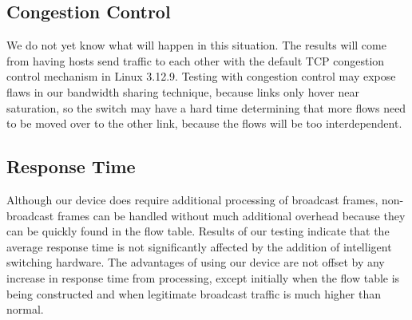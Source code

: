   \subsection{Congestion Control}
    We do not yet know what will happen in this situation.
    The results will come from having hosts send traffic to each other with the default TCP congestion control mechanism in Linux 3.12.9.
    Testing with congestion control may expose flaws in our bandwidth sharing technique, because links only hover near saturation, so the switch may have a hard time determining that more flows need to be moved over to the other link, because the flows will be too interdependent.

  \subsection{Response Time}
    Although our device does require additional processing of broadcast frames, non-broadcast frames can be handled without much additional overhead because they can be quickly found in the flow table.
    Results of our testing indicate that the average response time is not significantly affected by the addition of intelligent switching hardware.
    The advantages of using our device are not offset by any increase in response time from processing, except initially when the flow table is being constructed and when legitimate broadcast traffic is much higher than normal.
